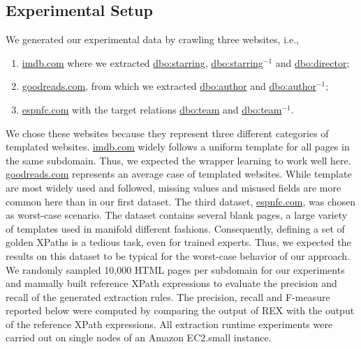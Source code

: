 \subsection{Experimental Setup}
We generated our experimental data by crawling three websites, i.e., 
\begin{enumerate}
\item \url{imdb.com} where we extracted \url{dbo:starring}, \url{dbo:starring}$^{-1}$ and \url{dbo:director};
\item \url{goodreads.com}, from which we extracted \url{dbo:author} and \url{dbo:author}$^{-1}$;
\item \url{espnfc.com} with the target relations \url{dbo:team} and \url{dbo:team}$^{-1}$.
\end{enumerate}
We chose these websites because they represent three different categories of templated websites.
\url{imdb.com} widely follows a uniform template for all pages in the same subdomain.
Thus, we expected the wrapper learning  to work well here.
\url{goodreads.com} represents an average case of templated websites. 
While template are most widely used and followed, missing values and misused fields are more common here than in our first dataset.
The third dataset, \url{espnfc.com}, was chosen as worst-case scenario.
The dataset contains several blank pages, a large variety of  templates used in manifold different fashions.
Consequently, defining a set of golden XPaths is a tedious task, even for trained experts.
Thus, we expected the results on this dataset to be typical for the worst-case behavior of our approach.
We randomly sampled 10,000 HTML pages per subdomain for our experiments and manually built reference XPath expressions to evaluate the precision and recall of the generated extraction rules. 
The precision, recall and F-measure reported below were computed by comparing the output of REX with the output of the reference XPath expressions.
All extraction runtime experiments were carried out on single nodes of an Amazon EC2.small instance.



